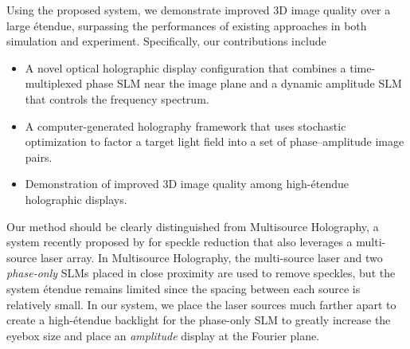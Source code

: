 Using the proposed system, we demonstrate improved 3D image quality over a large \'etendue, surpassing the performances of existing approaches in both simulation and experiment. Specifically, our contributions include 
%
\begin{itemize}
    \item A novel optical holographic display configuration that combines a time-multiplexed phase SLM near the image plane and a dynamic amplitude SLM that controls the frequency spectrum.
    \item A computer-generated holography framework that uses stochastic optimization to factor a target light field into a set of phase--amplitude image pairs.
    \item Demonstration of improved 3D image quality among high-\'etendue holographic displays.
\end{itemize}

Our method should be clearly distinguished from Multisource Holography, a system recently proposed by \citet{grace2023multi} for speckle reduction that also leverages a multi-source laser array. In Multisource Holography, the multi-source laser and two \textit{phase-only} SLMs placed in close proximity are used to remove speckles, but the system \'etendue remains limited since the spacing between each source is relatively small. In our system, we place the laser sources much farther apart to create a high-\'etendue backlight for the phase-only SLM to greatly increase the eyebox size and place an \textit{amplitude} display at the Fourier plane.